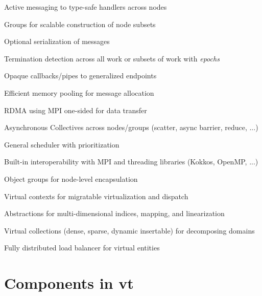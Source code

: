 \begin{DoxyItemize}
\item Active messaging to type-\/safe handlers across nodes
\item Groups for scalable construction of node subsets
\item Optional serialization of messages
\item Termination detection across all work or subsets of work with {\itshape epochs} 
\item Opaque callbacks/pipes to generalized endpoints
\item Efficient memory pooling for message allocation
\item R\+D\+MA using M\+PI one-\/sided for data transfer
\item Asynchronous Collectives across nodes/groups (scatter, async barrier, reduce, ...)
\item General scheduler with prioritization
\item Built-\/in interoperability with M\+PI and threading libraries (Kokkos, Open\+MP, ...)
\item Object groups for node-\/level encapsulation
\item Virtual contexts for migratable virtualization and dispatch
\item Abstractions for multi-\/dimensional indices, mapping, and linearization
\item Virtual collections (dense, sparse, dynamic insertable) for decomposing domains
\item Fully distributed load balancer for virtual entities
\end{DoxyItemize}\hypertarget{introduction_vt-components}{}\section{Components in vt}\label{introduction_vt-components}
\tabulinesep=1mm
